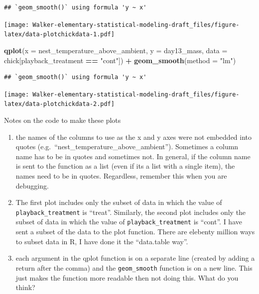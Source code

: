 \documentclass[]{book}
\newenvironment{Shaded}{\begin{snugshade}}{\end{snugshade}}
\newcommand{\DataTypeTok}[1]{\textcolor[rgb]{0.13,0.29,0.53}{#1}}
\newcommand{\KeywordTok}[1]{\textcolor[rgb]{0.13,0.29,0.53}{\textbf{#1}}}
\newcommand{\NormalTok}[1]{#1}
\newcommand{\OperatorTok}[1]{\textcolor[rgb]{0.81,0.36,0.00}{\textbf{#1}}}
\newcommand{\StringTok}[1]{\textcolor[rgb]{0.31,0.60,0.02}{#1}}
\providecommand{\tightlist}{%
  \setlength{\itemsep}{0pt}\setlength{\parskip}{0pt}}
\begin{document}
\begin{verbatim}
## `geom_smooth()` using formula 'y ~ x'
\end{verbatim}

\texttt{[image: Walker-elementary-statistical-modeling-draft\_files/figure-latex/data-plotchickdata-1.pdf]}

\begin{Shaded}
\begin{Highlighting}[]
\KeywordTok{qplot}\NormalTok{(}\DataTypeTok{x =}\NormalTok{ nest_temperature_above_ambient,}
      \DataTypeTok{y =}\NormalTok{ day13_mass,}
      \DataTypeTok{data =}\NormalTok{ chick[playback_treatment }\OperatorTok{==}\StringTok{ "cont"}\NormalTok{]) }\OperatorTok{+}
\StringTok{  }\KeywordTok{geom_smooth}\NormalTok{(}\DataTypeTok{method =} \StringTok{"lm"}\NormalTok{)}
\end{Highlighting}
\end{Shaded}

\begin{verbatim}
## `geom_smooth()` using formula 'y ~ x'
\end{verbatim}

\texttt{[image: Walker-elementary-statistical-modeling-draft\_files/figure-latex/data-plotchickdata-2.pdf]}

Notes on the code to make these plots

\begin{enumerate}
\def\labelenumi{\arabic{enumi}.}
\tightlist
\item
  the names of the columns to use as the x and y axes were not embedded into quotes (e.g.~``nest\_temperature\_above\_ambient''). Sometimes a column name has to be in quotes and sometimes not. In general, if the column name is sent to the function as a list (even if its a list with a single item), the names need to be in quotes. Regardless, remember this when you are debugging.
\item
  The first plot includes only the subset of data in which the value of \texttt{playback\_treatment} is ``treat''. Similarly, the second plot includes only the subset of data in which the value of \texttt{playback\_treatment} is ``cont''. I have sent a subset of the data to the plot function. There are elebenty million ways to subset data in R, I have done it the ``data.table way''.
\item
  each argument in the qplot function is on a separate line (created by adding a return after the comma) and the \texttt{geom\_smooth} function is on a new line. This just makes the function more readable then not doing this. What do you think?
\end{enumerate}
\end{document}
